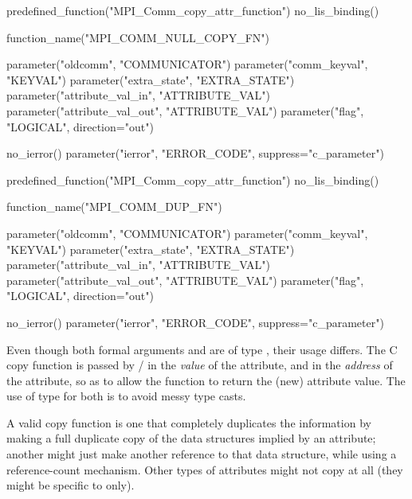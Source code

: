 \begin{mpi-binding}
    predefined_function("MPI_Comm_copy_attr_function")
    no_lis_binding()
    
    function_name("MPI_COMM_NULL_COPY_FN")
    
    parameter("oldcomm", "COMMUNICATOR")
    parameter("comm_keyval", "KEYVAL")
    parameter("extra_state", "EXTRA_STATE")
    parameter("attribute_val_in", "ATTRIBUTE_VAL")
    parameter("attribute_val_out", "ATTRIBUTE_VAL")
    parameter("flag", "LOGICAL", direction="out")
    
    no_ierror()
    parameter("ierror", "ERROR_CODE", suppress="c_parameter")
\end{mpi-binding}

\begin{mpi-binding}
    predefined_function("MPI_Comm_copy_attr_function")
    no_lis_binding()
    
    function_name("MPI_COMM_DUP_FN")
    
    parameter("oldcomm", "COMMUNICATOR")
    parameter("comm_keyval", "KEYVAL")
    parameter("extra_state", "EXTRA_STATE")
    parameter("attribute_val_in", "ATTRIBUTE_VAL")
    parameter("attribute_val_out", "ATTRIBUTE_VAL")
    parameter("flag", "LOGICAL", direction="out")
    
    no_ierror()
    parameter("ierror", "ERROR_CODE", suppress="c_parameter")
\end{mpi-binding}

\begin{users}
Even though both formal arguments  and
 are of type , their usage differs.
The C copy function is passed by \MPI/ in 
the \emph{value} of the attribute, and in
 the \emph{address} of the attribute, so as
to allow the function to return the (new) attribute value.
The use of type  for both is to avoid messy type casts.

A valid copy function is one that completely duplicates the
information by making a full duplicate copy of the data structures
implied by an attribute; another might just make another reference to
that data structure, while using a reference-count mechanism. Other
types of attributes might not copy at all (they might be specific to
 only).
\end{users}

